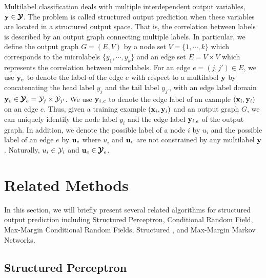 {Multilabel classification deals with multiple interdependent output variables, $\mathbf {y}\in\pmb {\mathcal{Y}}$.
The problem is called {structured output prediction} when these variables are located in a structured output space.
That is, the correlation between labels is described by an {output graph} connecting multiple labels.
In particular, we define the output graph $G=(E,V)$ by a node set $V=\{1,\cdots,k\}$ which corresponds to the microlabels $\{y_1,\cdots,y_k\}$ and an edge set $E=V\times V$ which represents the correlation between microlabels.
For an edge $e=(j,j')\in E$, we use $\mathbf {y}_e$ to denote the label of the edge $e$ with respect to a multilabel $\mathbf {y}$ by concatenating the head label $y_j$ and the tail label $y_{j'}$, with an edge label domain $\mathbf {y}_e\in\pmb {\mathcal{Y}}_e=\mathcal{Y}_j\times\mathcal{Y}_{j'}$.
We use $\mathbf {y}_{i,e}$ to denote the edge label of an example $(\mathbf {x}_i,\mathbf {y}_i)$ on an edge $e$.
Thus, given a training example $(\mathbf {x}_i,\mathbf {y}_i)$ and an output graph $G$, we can uniquely identify the node label $y_i$ and the edge label $\mathbf {y}_{i,e}$ of the output graph.
In addition, we denote the possible label of a node $i$ by $u_i$ and the possible label of an edge $e$ by $\mathbf {u}_{e}$ where $u_i$ and $\mathbf {u}_{e}$ are not constrained by any multilabel $\mathbf {y}$.
Naturally, $u_i\in\mathcal{Y}_i$ and $\mathbf {u}_e\in\pmb {\mathcal{Y}}_e$.



%
%
\section{Related Methods}

In this section, we will briefly present several related algorithms for structured output prediction including Structured Perceptron, Conditional Random Field, Max-Margin Conditional Random Fields, Structured \svm, and Max-Margin Markov Networks.



%
%
\subsection{Structured Perceptron}

}
